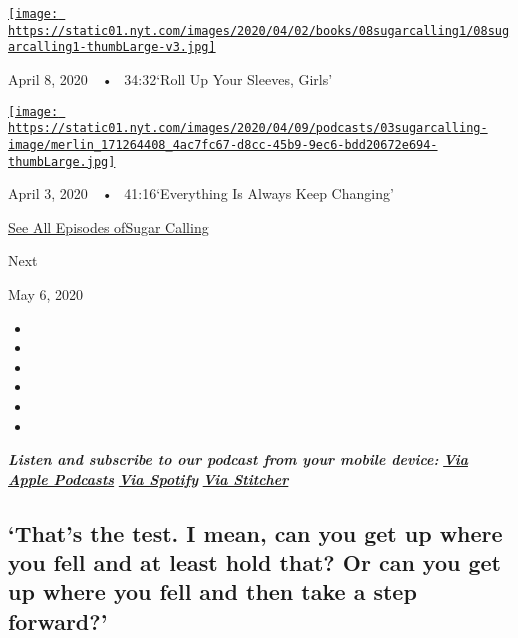 \href{https://www.nytimes.com/2020/04/08/podcasts/sugar-calling-margaret-atwood-coronavirus.html?action=click\&module=audio-series-bar\&region=header\&pgtype=Article}{\texttt{[image: https://static01.nyt.com/images/2020/04/02/books/08sugarcalling1/08sugarcalling1-thumbLarge-v3.jpg]}}

April 8, 2020~~•~ 34:32`Roll Up Your Sleeves, Girls'

\href{https://www.nytimes.com/2020/04/03/podcasts/sugar-calling-george-saunders-coronavirus.html?action=click\&module=audio-series-bar\&region=header\&pgtype=Article}{\texttt{[image: https://static01.nyt.com/images/2020/04/09/podcasts/03sugarcalling-image/merlin\_171264408\_4ac7fc67-d8cc-45b9-9ec6-bdd20672e694-thumbLarge.jpg]}}

April 3, 2020~~•~ 41:16`Everything Is Always Keep Changing'

\href{https://www.nytimes.com/column/sugar-calling}{See All Episodes
ofSugar Calling}

Next

May 6, 2020

\begin{itemize}
\item
\item
\item
\item
\item
\item
\end{itemize}

\emph{\textbf{Listen and subscribe to our podcast from your mobile
device:}}
\textbf{\href{https://podcasts.apple.com/us/podcast/sugar-calling/id1505881384}{\emph{Via
Apple Podcasts}}} \emph{\textbf{\textbar{}}}
\textbf{\href{https://open.spotify.com/show/4U8hPiNGIBvTS9zLeiDCN7?si=gRyigD47SPWl-QWgNjgt2w}{\emph{Via
Spotify}}} \emph{\textbf{\textbar{}}}
\textbf{\href{https://www.stitcher.com/podcast/the-new-york-times/sugar-calling}{\emph{Via
Stitcher}}}

\hypertarget{thats-the-test-i-mean-can-you-get-up-where-you-fell-and-at-least-hold-that-or-can-you-get-up-where-you-fell-and-then-take-a-step-forward}{%
\subsection{`That's the test. I mean, can you get up where you fell and
at least hold that? Or can you get up where you fell and then take a
step
forward?'}\label{thats-the-test-i-mean-can-you-get-up-where-you-fell-and-at-least-hold-that-or-can-you-get-up-where-you-fell-and-then-take-a-step-forward}}

